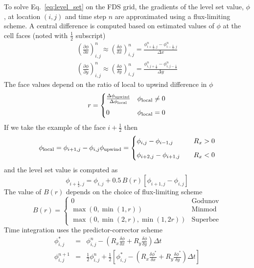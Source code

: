 To solve Eq.~\ref{eq:level_set} on the FDS grid, the gradients of the level set value, $\phi$, at location $(i,j)$ and time step $n$ are approximated using a flux-limiting scheme. A central difference is computed based on estimated values of $\phi$ at the cell faces (noted with $\frac{1}{2}$ subscript)
\begin{gather}
\left(\frac{\partial \phi}{\partial x}\right)_{i, j}^{n} \approx \left(\frac{\delta \phi}{\delta x}\right)_{i, j}^{n} =
\frac{\phi_{i+\frac{1}{2}, j}^{n}-\phi_{i-\frac{1}{2}, j}^{n}}{\Delta x} \\[8pt]
\left(\frac{\partial \phi}{\partial y}\right)_{i, j}^{n} \approx \left(\frac{\delta \phi}{\delta y}\right)_{i, j}^{n} =
\frac{\phi_{i, j+\frac{1}{2}}^{n}-\phi_{i, j-\frac{1}{2}}^{n}}{\Delta y}
\end{gather}
The face values depend on the ratio of local to upwind difference in $\phi$
\begin{equation}
r= \begin{cases}
    \frac{\Delta \phi_{\rm upwind}}{\Delta \phi_{\rm local}} & \phi_{\rm local} \neq 0 \\[6pt]
    0 & \phi_{\rm local} = 0
\end{cases}
\end{equation}
If we take the example of the face $i+\frac{1}{2}$ then
\begin{gather}
\phi_{\rm local} = \phi_{i+1, j}-\phi_{i, j}
\phi_{\rm upwind}= \begin{cases}
    \phi_{i, j}-\phi_{i-1, j} &  \quad R_x > 0 \\[6pt]
    \phi_{i+2, j}-\phi_{i+1, j} & \quad R_x < 0
\end{cases}
\end{gather}
and the level set value is computed as
\begin{equation}
\phi_{i+\frac{1}{2},j} = \phi_{i,j} + 0.5 \, B(r) \left[\phi_{i+1,j}-\phi_{i,j} \right]
\end{equation}
The value of $B(r)$ depends on the choice of flux-limiting scheme
\begin{equation}
B(r)= \begin{cases}
    0 & \mathrm{Godunov} \\[4pt]
    \max(0, \min(1,r)) & \mathrm{Minmod} \\[4pt]
    \max(0, \min(2,r), \min(1,2r)) & \mathrm{Superbee}
\end{cases}
\end{equation}
Time integration uses the predictor-corrector scheme
\begin{eqnarray}
\phi_{i, j}^{*} &=& \phi_{i, j}^{n}-\left(R_{x} \frac{\delta \phi}{\delta x}+R_{y} \frac{\delta \phi}{\delta y}\right) \Delta t \\[8pt]
\phi_{i, j}^{n+1} &=& \frac{1}{2} \phi_{i, j}^{n}+\frac{1}{2}\left[\phi_{i, j}^{*}-\left(R_{x} \frac{\delta \phi^{*}}{\delta x}+R_{y} \frac{\delta \phi^{*}}{\delta y}\right) \Delta t\right]
\end{eqnarray}
